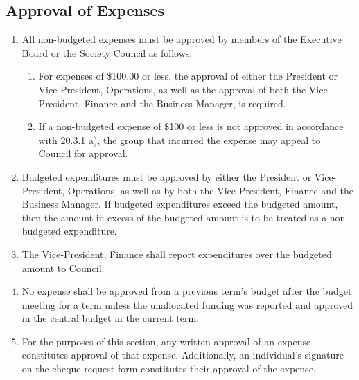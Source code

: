 \subsection{Approval of Expenses}
\begin{enumerate}
\item All non-budgeted expenses must be approved by members of the Executive Board or the Society Council as follows.
\begin{enumerate}
\item For expenses of \$100.00 or less, the approval of either the President or Vice-President, Operations, as well as the approval of both the Vice-President, Finance and the Business Manager, is required.
\item If a non-budgeted expense of \$100 or less is not approved in accordance with 20.3.1 a), the group that incurred the expense may appeal to Council for approval.
\end{enumerate}
\item Budgeted expenditures must be approved by either the President or Vice-President, Operations, as well as by both the Vice-President, Finance and the Business Manager. If budgeted expenditures exceed the budgeted amount, then the amount in excess of the budgeted amount is to be treated as a non-budgeted expenditure.
\item The Vice-President, Finance shall report expenditures over the budgeted amount to Council.
\item No expense shall be approved from a previous term's budget after the budget meeting for a term unless the unallocated funding was reported and approved in the central budget in the current term.
\item For the purposes of this section, any written approval of an expense constitutes approval of that expense. Additionally, an individual's signature on the cheque request form constitutes their approval of the expense.
\end{enumerate}


